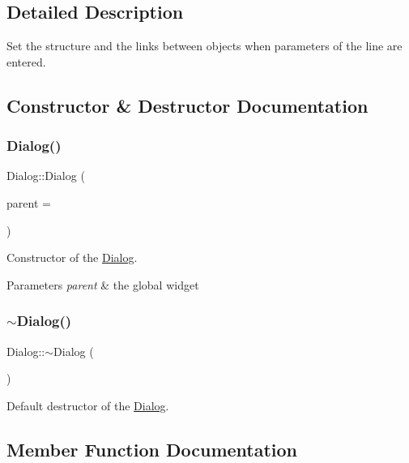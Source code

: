 \subsection{Detailed Description}
Set the structure and the links between objects when parameters of the line are entered. 

\subsection{Constructor \& Destructor Documentation}
\hypertarget{class_dialog_acfa2063f9f962d394c6a645b6e7e08d8}{}\label{class_dialog_acfa2063f9f962d394c6a645b6e7e08d8} 
\subsubsection{\texorpdfstring{Dialog()}{Dialog()}}
{\footnotesize\ttfamily Dialog\+::\+Dialog (\begin{DoxyParamCaption}\item[{Q\+Widget $\ast$}]{parent = {} }\end{DoxyParamCaption})\hspace{0.3cm}{\ttfamily [explicit]}}



Constructor of the \hyperlink{class_dialog}{Dialog}. 


\begin{DoxyParams}{Parameters}
{\em parent} & the global widget \\
\hline
\end{DoxyParams}
\hypertarget{class_dialog_a2a1fe6ef28513eed13bfcd3a4da83ccb}{}\label{class_dialog_a2a1fe6ef28513eed13bfcd3a4da83ccb} 
\subsubsection{\texorpdfstring{$\sim$\+Dialog()}{~Dialog()}}
{\footnotesize\ttfamily Dialog\+::$\sim$\+Dialog (\begin{DoxyParamCaption}{ }\end{DoxyParamCaption})}



Default destructor of the \hyperlink{class_dialog}{Dialog}. 



\subsection{Member Function Documentation}
\hypertarget{class_dialog_a378ce1b268dfbb518ea04bb5a7032a4e}{}\label{class_dialog_a378ce1b268dfbb518ea04bb5a7032a4e} 

